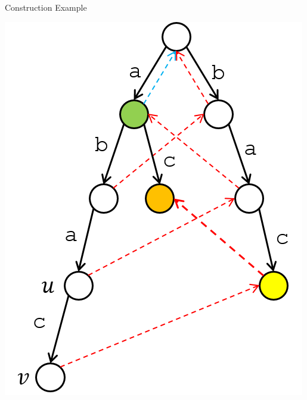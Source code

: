 \documentclass[13pt,onlymath]{beamer}
\begin{document}
\begin{frame}{Construction Example}
\begin{center}
\includegraphics[height=0.5\textheight]{figures/trie4}
\end{center}
\end{frame}
\end{document}
